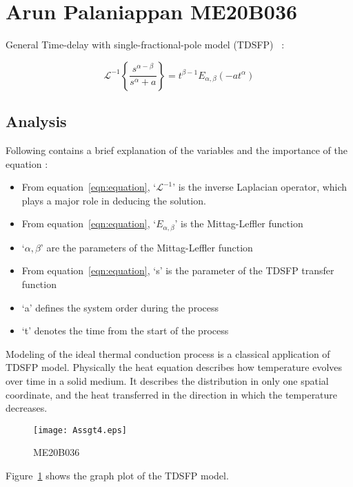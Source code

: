 \documentclass[a4paper, 12pt]{article}
\begin{document}
\section{Arun Palaniappan ME20B036}

General Time-delay with single-fractional-pole model (TDSFP)~\cite{YUAN2022108111} :

\begin{equation}
 \mathcal{L}^{-1}\left \{\frac{s^{\alpha-\beta}}{s^{\alpha} + a} \right\} = t^{\beta-1}E_{\alpha,\beta}(-at^{\alpha})
 \label{eqn:equation}
\end{equation}

\subsection{Analysis}
Following contains a brief explanation of the variables and the importance of the equation :
\begin{itemize}

    \item From equation~\ref{eqn:equation}, `$\mathcal{L}^{-1}$' is the inverse Laplacian operator, which plays a major role in deducing the solution.
    \item From equation~\ref{eqn:equation}, `$E_{\alpha,\beta}$' is the Mittag-Leffler function
    \item `$\alpha,\beta$' are the parameters of the Mittag-Leffler function
    \item From equation~\ref{eqn:equation}, `s' is the parameter of the TDSFP transfer function
    \item `a' defines the system order during the process
    \item `t' denotes the time from the start of the process
\end{itemize}
Modeling of the ideal thermal conduction process is a classical application of TDSFP model. Physically the heat equation describes how temperature evolves over time in a solid medium. It describes the distribution in only one spatial coordinate, and the heat transferred in the direction in which the temperature decreases.~\cite{YUAN2022108111}

\begin{figure}[h]
	\begin{center}
		\texttt{[image: Assgt4.eps]}
	\end{center}
	\caption{ME20B036}
	\label{f1:image}
\end{figure}


Figure~\ref{f1:image} shows the graph plot of the TDSFP model.~\cite{YUAN2022108111}



\end{document}
